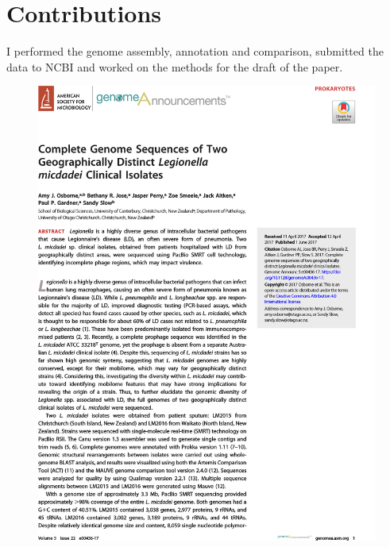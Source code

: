 \section{Contributions}
I performed the genome assembly, annotation and comparison, submitted the data to NCBI and worked on the methods for the draft of the paper. 
\newpage
\begin{figure}
    \centering
    \includegraphics[width=\linewidth]{other/legionella_1.png}
\end{figure}
